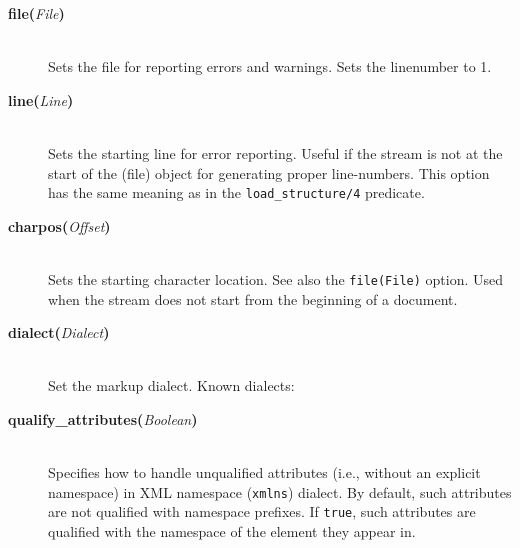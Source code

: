 \begin{description}
  \begin{description}
  \item[{\bf file}{\bf (}{\it File}{\bf )}]\mbox{}\\
    Sets the file for reporting errors and warnings. Sets the linenumber to 1. 
  \item[{\bf line}{\bf (}{\it Line}{\bf )}]\mbox{}\\
    Sets the starting line for error reporting. Useful if the stream is not
    at the start of the (file) object for generating proper line-numbers.
    This option has the same meaning as in the {\tt load\_structure/4}
    predicate. 

  \item[{\bf charpos}{\bf (}{\it Offset}{\bf )}]\mbox{}\\
    Sets the starting character location.  See also the {\tt file(File)}
    option. Used when the stream does not start from the beginning of a
    document. 

  \item[{\bf dialect}{\bf (}{\it Dialect}{\bf )}]\mbox{}\\
    Set the markup dialect. Known dialects: 



  \item[{\bf qualify\_attributes}{\bf (}{\it Boolean}{\bf )}]\mbox{}\\
    Specifies how
    to handle unqualified attributes (i.e., without an explicit namespace)
    in XML namespace ({\tt xmlns}) dialect.  By default, such attributes
    are not qualified with namespace prefixes.
    If {\tt true}, such attributes are qualified
    with the namespace of the element they appear in.


\end{description}
\end{description}
